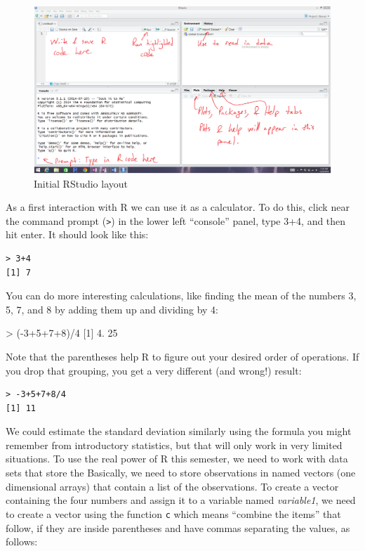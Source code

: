 \documentclass[]{book}
\newenvironment{Shaded}{\begin{snugshade}}{\end{snugshade}}
\newcommand{\DecValTok}[1]{\textcolor[rgb]{0.00,0.00,0.81}{{#1}}}
\newcommand{\StringTok}[1]{\textcolor[rgb]{0.31,0.60,0.02}{{#1}}}
\newcommand{\NormalTok}[1]{{#1}}
\begin{document}
\begin{figure}
\includegraphics[width=14.72in]{chapter0_files/image003} \caption{Initial RStudio layout}\label{fig:Figure2}
\end{figure}

As a first interaction with R we can use it as a calculator. To do this,
click near the command prompt (\texttt{\textgreater{}}) in the lower
left ``console'' panel, type 3+4, and then hit enter. It should look
like this:

\begin{verbatim}
> 3+4
[1] 7
\end{verbatim}

You can do more interesting calculations, like finding the mean of the
numbers 3, 5, 7, and 8 by adding them up and dividing by 4:

\begin{Shaded}
\begin{Highlighting}[]
\NormalTok{>}\StringTok{ }\NormalTok{(-}\DecValTok{3+5+7+8}\NormalTok{)/}\DecValTok{4}
\NormalTok{[}\DecValTok{1}\NormalTok{] }\DecValTok{4}\NormalTok{. }\DecValTok{25}
\end{Highlighting}
\end{Shaded}

Note that the parentheses help R to figure out your desired order of
operations. If you drop that grouping, you get a very different (and
wrong!) result:

\begin{verbatim}
> -3+5+7+8/4
[1] 11
\end{verbatim}

We could estimate the standard deviation similarly using the formula you
might remember from introductory statistics, but that will only work in
very limited situations. To use the real power of R this semester, we
need to work with data sets that store the Basically, we need to store
observations in named vectors (one dimensional arrays) that contain a
list of the observations. To create a vector containing the four numbers
and assign it to a variable named \emph{variable1}, we need to create a
vector using the function \texttt{c} which means ``combine the items''
that follow, if they are inside parentheses and have commas separating
the values, as follows:
\end{document}
